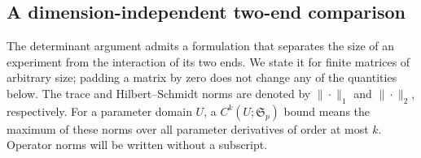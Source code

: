 \subsection{A dimension-independent two-end comparison}
\label{sec:v76-relative-principle}

The determinant argument admits a formulation that separates the size of
an experiment from the interaction of its two ends.  We state it for
finite matrices of arbitrary size; padding a matrix by zero does not
change any of the quantities below.  The trace and Hilbert--Schmidt norms
are denoted by $\|\cdot\|_1$ and $\|\cdot\|_2$, respectively.
For a parameter domain $U$, a $C^k(U;\mathfrak S_p)$ bound means the
maximum of these norms over all parameter derivatives of order at most
$k$.  Operator norms will be written without a subscript.


